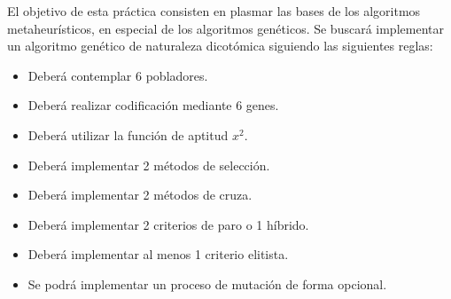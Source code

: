 El objetivo de esta práctica consisten en plasmar las bases de los algoritmos metaheurísticos, en especial de los algoritmos genéticos. Se buscará implementar un algoritmo genético de naturaleza dicotómica siguiendo las siguientes reglas:

\begin{itemize}
	\item Deberá contemplar 6 pobladores.
	\item Deberá realizar codificación mediante 6 genes.
	\item Deberá utilizar la función de aptitud $x^2$.
	\item Deberá implementar 2 métodos de selección.
	\item Deberá implementar 2 métodos de cruza.
	\item Deberá implementar 2 criterios de paro o 1 híbrido.
	\item Deberá implementar al menos 1 criterio elitista.
	\item Se podrá implementar un proceso de mutación de forma opcional.
\end{itemize}